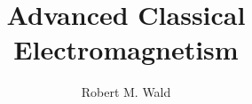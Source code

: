 \documentclass[english, 11pt, a4paper]{book}
\begin{document}
\newcommand{\textlmss}{\fontfamily{lmss}\selectfont}
\newcommand{\texthv}{\fontfamily{phv}\selectfont}

\newcommand{\tlmss}[1]{\text{\textlmss{#1}}}
\newcommand{\thv}[1]{\text{\texthv{#1}}}

\newcommand{\transp}[1]{{#1}^{\tlmss{T}}}

\newcommand{\Adj}[1]{{#1}^\dagger}

\newcommand{\Hconj}[1]{{#1}^{+}}

\newcommand{\Ker}{\tlmss{Ker}\,}
\newcommand{\Coker}{\tlmss{Coker}\,}
\newcommand{\Img}{\tlmss{Im}\,}

\newcommand{\Alt}{\tlmss{Alt}\,}
\newcommand{\alt}{\tlmss{alt}\,}

\newcommand{\Ann}{\tlmss{Ann}\,}

\newcommand{\ora}[1]{\overrightarrow{#1}}

\DeclareRobustCommand{\rchi}{{\mathpalette\irchi\relax}}
\newcommand{\irchi}[2]{\raisebox{\depth}{$#1\chi$}} %

\makeatletter
\newcommand{\mybox}{%
    \collectbox{%
        \setlength{\fboxsep}{1pt}%
        \fbox{\BOXCONTENT}%
    }%
}
\makeatother

\author{Robert M. Wald}
\title{Advanced Classical Electromagnetism}
\maketitle

\frontmatter%

%

%	
\tableofcontents

\mainmatter%




\appendixpage
\appendix

%
%
%
%

\backmatter%
%
\printindex

\end{document}
